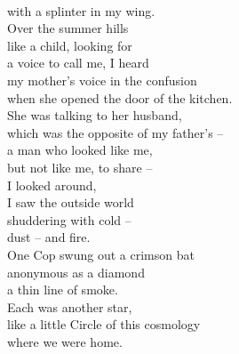 \documentclass[smalldemyvopaper,11pt,twoside,onecolumn,openright,extrafontsizes]{memoir}
\begin{document}
\\with a splinter in my wing.
\\Over the summer hills
\\like a child, looking for
\\a voice to call me, I heard
\\my mother's voice in the confusion
\\when she opened the door of the kitchen.
\\She was talking to her husband,
\\which was the opposite of my father's --
\\a man who looked like me,
\\but not like me, to share --
\\I looked around,
\\I saw the outside world
\\shuddering with cold --
\\dust -- and fire.
\\One Cop swung out a crimson bat
\\anonymous as a diamond
\\a thin line of smoke.
\\Each was another star,
\\like a little Circle of this cosmology
\\where we were home.
\end{document}
